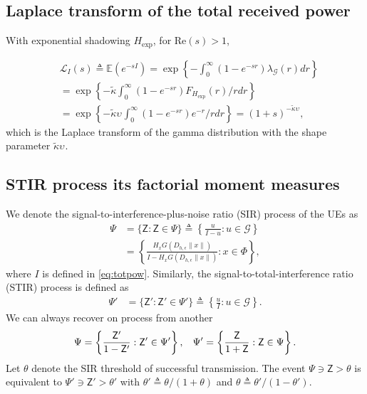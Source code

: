 \documentclass[lettersize,journal]{IEEEtran}
\begin{document}
\subsection{Laplace transform of the total received power}

With exponential shadowing ${H}_{\text{exp}}$, for Re$(s)>1$,

\begin{align}
  \label{eq:lapdef}
  &\mathcal{L}_{I}(s)\triangleq \mathbb{E}\left(e^{-sI}\right)= \exp\left\{-\int_0^{\infty}(1-e^{-sr}) \lambda_{\mathcal{G}}(r) dr \right\} \nonumber \\
  &=\exp\left\{-\tilde{\kappa}\int_0^{\infty}(1-e^{-sr}) F_{{H}_{\text{exp}}}(r) /r dr \right\} \nonumber \\
  &=\exp\left\{-\tilde{\kappa}\upsilon_{}\int_0^{\infty}(1-e^{-sr}) e^{-r} /r dr \right\} =(1+s)^{-\tilde{\kappa}\upsilon_{}},
\end{align}
which is the Laplace transform of the gamma distribution with the shape parameter $\tilde{\kappa}\upsilon_{}$. 



\subsection{STIR process its factorial moment measures}
 We denote the signal-to-interference-plus-noise ratio (SIR) process of the UEs as
\begin{align}
  \label{eq:SINR}
  \Psi &= \{\mathsf{Z}: \mathsf{Z} \in \Psi\} \triangleq \left\{ \frac{u}{I-u} : u \in \mathcal{G}\right\} \nonumber \\
  &=\left\{ \frac{H_x G(D_{h,\epsilon}\|x\|)}{I-H_x G(D_{h,\epsilon}\|x\|)} : x \in \Phi\right\},
\end{align}
where $I$ is defined in \eqref{eq:totpow}. Similarly, the signal-to-total-interference ratio (STIR) process is defined as
\begin{align}
  \label{eq:STINR}
  \Psi' &= \{\mathsf{Z}': \mathsf{Z}' \in \Psi'\} \triangleq \left\{ \frac{u}{I} : u \in \mathcal{G}\right\}.
\end{align}
We can always recover on process from another
\begin{equation}
  \Psi = \left\{ \frac{\mathsf{Z}'}{1- \mathsf{Z}'}: \mathsf{Z}' \in \Psi' \right\}, \hspace{0.3cm} \Psi' = \left\{ \frac{\mathsf{Z}}{1+ \mathsf{Z}}: \mathsf{Z} \in \Psi \right\}.
\end{equation}
Let $\theta$ denote the SIR threshold of successful transmission. The event $\Psi \ni\mathsf{Z}> \theta$ is equivalent to $\Psi' \ni \mathsf{Z}'> \theta'$  with $\theta' \triangleq \theta/(1+\theta)$ and $\theta \triangleq \theta'/(1-\theta')$.
\end{document}
